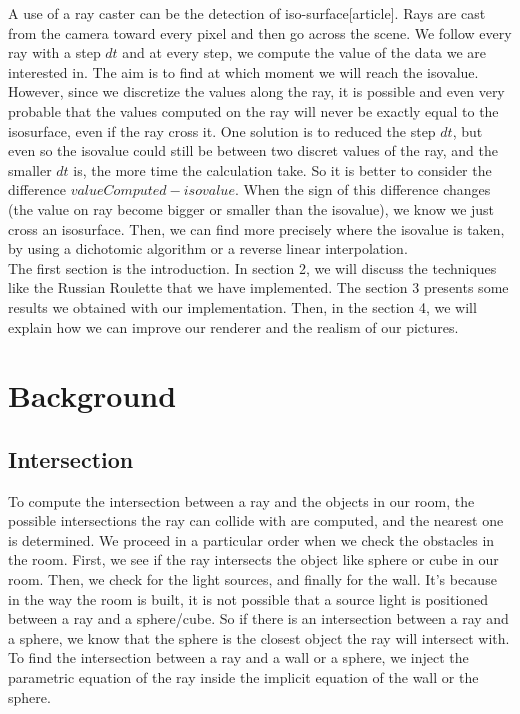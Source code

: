 \documentclass[12pt]{article}
\numberwithin{equation}{section}
\begin{document}
A use of a ray caster can be the detection of iso-surface[article]. Rays are cast from the camera toward every pixel and then go across the scene. We follow every ray with a step $dt$ and at every step, we compute the value of the data we are interested in. The aim is to find at which moment we will reach the isovalue. However, since we discretize the values along the ray, it is possible and even very probable that the values computed on the ray will never be exactly equal to the isosurface, even if the ray cross it. One solution is to reduced the step $dt$, but even so the isovalue could still be between two discret values of the ray, and the smaller $dt$ is, the more time the calculation take. So it is better to consider the difference $valueComputed - isovalue$. When the sign of this difference changes (the value on ray become bigger or smaller than the isovalue), we know we just cross an isosurface. Then, we can find more precisely where the isovalue is taken, by using a dichotomic algorithm or a reverse linear interpolation.\\

The first section is the introduction. In section 2, we will discuss the techniques like the Russian Roulette that we have implemented. The section 3 presents some results we obtained with our implementation. Then, in the section 4, we will explain how we can improve our renderer and the realism of our pictures. 

\section{Background}

\subsection{Intersection}

To compute the intersection between a ray and the objects in our room, the possible intersections the ray can collide with are computed, and the nearest one is determined. We proceed in a particular order when we check the obstacles in the room. First, we see if the ray intersects the object like sphere or cube in our room. Then, we check for the light sources, and finally for the wall. It's because in the way the room is built, it is not possible that a source light is positioned between a ray and a sphere/cube. So if there is an intersection between a ray and a sphere, we know that the sphere is the closest object the ray will intersect with. To find the intersection between a ray and a wall or a sphere, we inject the parametric equation of the ray inside the implicit equation of the wall or the sphere.\\
\end{document}
